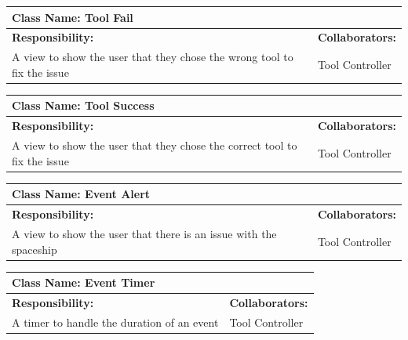 \documentclass[12pt, titlepage]{article}
\begin{document}
\begin{enumerate}[a)]
	\begin{table}[H]
		\centering
		\begin{tabular}{|p{5cm}|p{5cm}|}
		\hline 
		 \multicolumn{2}{|l|}{\textbf{Class Name: Tool Fail}} \\
		\hline
		\textbf{Responsibility:} & \textbf{Collaborators:} \\
		\hline
		 A view to show the user that they chose the wrong tool to fix the issue & Tool Controller\\
		\hline
		\end{tabular}
	\end{table}

	\begin{table}[H]
		\centering
		\begin{tabular}{|p{5cm}|p{5cm}|}
		\hline 
		 \multicolumn{2}{|l|}{\textbf{Class Name: Tool Success}} \\
		\hline
		\textbf{Responsibility:} & \textbf{Collaborators:} \\
		\hline
		 A view to show the user that they chose the correct tool to fix the issue & Tool Controller\\
		\hline
		\end{tabular}
	\end{table}

	\begin{table}[H]
		\centering
		\begin{tabular}{|p{5cm}|p{5cm}|}
		\hline 
		 \multicolumn{2}{|l|}{\textbf{Class Name: Event Alert}} \\
		\hline
		\textbf{Responsibility:} & \textbf{Collaborators:} \\
		\hline
		 A view to show the user that there is an issue with the spaceship & Tool Controller\\
		\hline
		\end{tabular}
	\end{table}

	\begin{table}[H]
		\centering
		\begin{tabular}{|p{5cm}|p{5cm}|}
		\hline 
		 \multicolumn{2}{|l|}{\textbf{Class Name: Event Timer}} \\
		\hline
		\textbf{Responsibility:} & \textbf{Collaborators:} \\
		\hline
		 A timer to handle the duration of an event & Tool Controller\\
		\hline
		\end{tabular}
	\end{table}


\end{enumerate}
\end{document}
